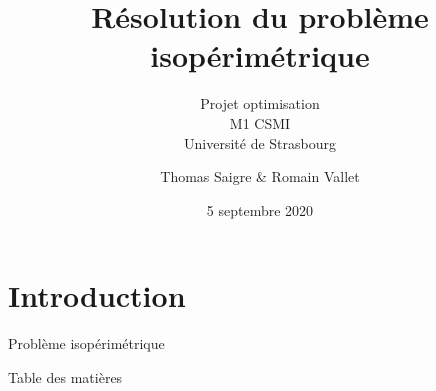 \documentclass[11pt,envcountsect,aspectratio=169]{beamer} %
\author[Thomas S. \& Romain V.]{Thomas Saigre \& Romain Vallet}
\title{Résolution du problème isopérimétrique}
\subtitle{Projet optimisation \\ M1 CSMI \\ Université de Strasbourg}
\date{5 septembre 2020}  %
\newcommand{\frametitre}{\begin{frame}
	\begin{center}
	{\Large\bf \secname}
	\end{center}
	\end{frame}
}
\begin{document}
\begin{frame}[plain]
\titlepage
\end{frame}


\section[Introduction]{Introduction}


\frametitre



\begin{frame}{Problème isopérimétrique}

\end{frame}





\begin{frame}{Table des matières}
\tableofcontents[hideallsubsections]
\end{frame}
\end{document}
